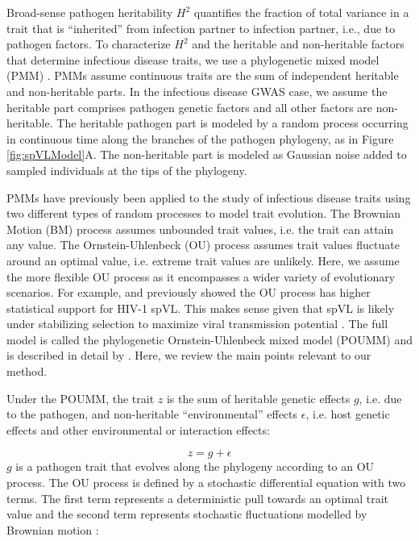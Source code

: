 \documentclass[11pt]{article}
\begin{document}
\begin{linenumbers}
Broad-sense pathogen heritability $H^2$ quantifies the fraction of total variance in a trait that is ``inherited'' from infection partner to infection partner, i.e., due to pathogen factors. To characterize $H^2$ and the heritable and non-heritable factors that determine infectious disease traits, we use a phylogenetic mixed model (PMM) \citep{Housworth2004}. PMMs assume continuous traits are the sum of independent heritable and non-heritable parts. In the infectious disease GWAS case, we assume the heritable part comprises pathogen genetic factors and all other factors are non-heritable. The heritable pathogen part is modeled by a random process occurring in continuous time along the branches of the pathogen phylogeny, as in Figure \ref{fig:spVLModel}A. The non-heritable part is modeled as Gaussian noise added to sampled individuals at the tips of the phylogeny.


PMMs have previously been applied to the study of infectious disease traits using two different types of random processes to model trait evolution. The Brownian Motion (BM) process assumes unbounded trait values, i.e. the trait can attain any value. The Ornstein-Uhlenbeck (OU) process assumes trait values fluctuate around an optimal value, i.e. extreme trait values are unlikely. Here, we assume the more flexible OU process as it encompasses a wider variety of evolutionary scenarios. For example, \citet{Mitov2018} and \citet{Bertels2018} previously showed the OU process has higher statistical support for HIV-1 spVL. This makes sense given that spVL is likely under stabilizing selection to maximize viral transmission potential \citep{Fraser2014}. The full model is called the phylogenetic Ornstein-Uhlenbeck mixed model (POUMM) and is described in detail by \citet{Mitov2018}. Here, we review the main points relevant to our method.

Under the POUMM, the trait $z$ is the sum of heritable genetic effects $g$, i.e. due to the pathogen, and non-heritable ``environmental'' effects $\epsilon$, i.e. host genetic effects and other environmental or interaction effects: 

\begin{equation}
    z = g + \epsilon
\end{equation}
$g$ is a pathogen trait that evolves along the phylogeny according to an OU process. The OU process is defined by a stochastic differential equation with two terms. The first term represents a deterministic pull towards an optimal trait value and the second term represents stochastic fluctuations modelled by Brownian motion \citep{Butler2004}:


\end{linenumbers}
\end{document}

